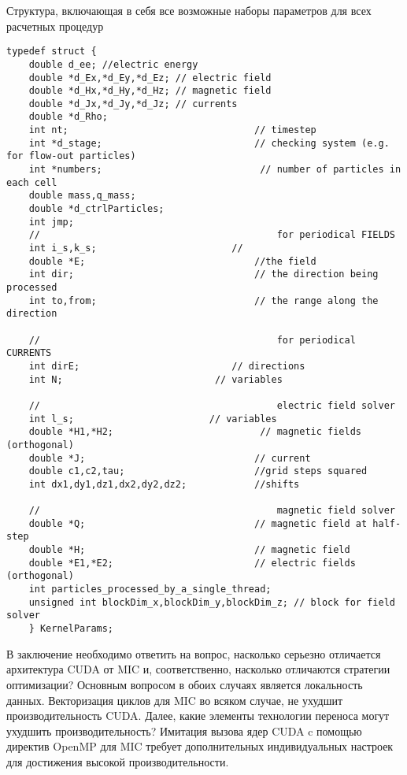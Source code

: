 \begin{ListingEnv}[!h]
\captiondelim{ } %
\caption{Структура, включающая в себя все возможные наборы параметров для всех расчетных процедур}
\label{parameter-struct}	
 \begin{lstlisting}[language={[ISO]C++}]
	typedef struct {
	double d_ee; //electric energy
	double *d_Ex,*d_Ey,*d_Ez; // electric field
	double *d_Hx,*d_Hy,*d_Hz; // magnetic field
	double *d_Jx,*d_Jy,*d_Jz; // currents
	double *d_Rho;
	int nt;                                 // timestep
	int *d_stage;                           // checking system (e.g. for flow-out particles)
	int *numbers;                            // number of particles in each cell
	double mass,q_mass;
	double *d_ctrlParticles;
	int jmp;
	//	                                        for periodical FIELDS
	int i_s,k_s;                        //
	double *E;                              //the field
	int dir;                                // the direction being processed
	int to,from;                            // the range along the direction
	
	//	                                        for periodical CURRENTS
	int dirE;                           // directions
	int N;                           // variables
	
	//                                          electric field solver
	int l_s;                        // variables
	double *H1,*H2;                          // magnetic fields (orthogonal)
	double *J;                              // current
	double c1,c2,tau;                       //grid steps squared
	int dx1,dy1,dz1,dx2,dy2,dz2;            //shifts
	
	//	                                        magnetic field solver
	double *Q;                              // magnetic field at half-step
	double *H;                              // magnetic field
	double *E1,*E2;                         // electric fields (orthogonal)
	int particles_processed_by_a_single_thread;
	unsigned int blockDim_x,blockDim_y,blockDim_z; // block for field solver
	} KernelParams;
	 \end{lstlisting}
	\end{ListingEnv}
\clearpage

В заключение необходимо ответить на вопрос, насколько серьезно отличается архитектура CUDA от  MIC и, соответственно, насколько отличаются стратегии оптимизации? 
Основным вопросом в обоих случаях является локальность данных. 
Векторизация циклов для MIC во всяком случае, не ухудшит производительность CUDA.
Далее, какие элементы технологии переноса могут ухудшить производительность?
Имитация вызова ядер CUDA c помощью директив OpenMP для MIC требует дополнительных индивидуальных настроек для достижения высокой производительности.



